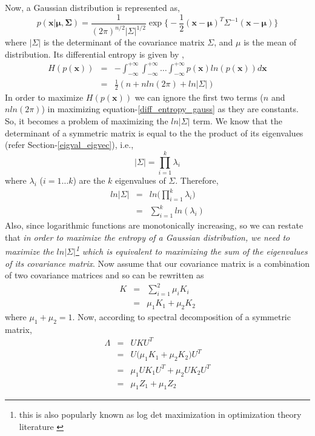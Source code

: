 Now, a Gaussian distribution is represented as,
\begin{equation}
p(\mathbf{x|\mu,\Sigma})=\frac{1}{(2\pi)^{n/2}\lvert\Sigma\rvert^{1/2}}\exp \big\lbrace -\frac{1}{2}(\mathbf{x-\mu})^{T}\Sigma^{-1} (\mathbf{x-\mu}) \big \rbrace
\end{equation}
where $\lvert\Sigma\rvert$ is the determinant of the covariance matrix $\Sigma$, and $\mu$ is the mean of distribution. Its differential entropy is given by \citep{brookes2005matrix},
\begin{eqnarray}
H(p(\mathbf{x})) &=& -\int_{-\infty}^{+\infty} \int_{-\infty}^{+\infty} \dots \int_{-\infty}^{+\infty}p(\mathbf{x})ln (p(\mathbf{x})) d\mathbf{x} \\
&=& \frac{1}{2}(n+n ln(2\pi)+ln|\Sigma|) \label{diff_entropy_gauss}
\end{eqnarray}
In order to maximize $H(p(\mathbf{x}))$ we can ignore the first two terms ($n$ and $n ln(2\pi)$) in maximizing equation-\ref{diff_entropy_gauss} as they are constants. So, it becomes a problem of maximizing the $ln|\Sigma|$ term. We know that the determinant of a symmetric matrix is equal to the the product of its eigenvalues (refer Section-\ref{eigval_eigvec}), i.e.,
\[
|\Sigma|=\prod_{i=1}^{k}\lambda_{i}
\]
where $\lambda_{i}$ ($i=1\dots k$) are the $k$ eigenvalues of $\Sigma$. Therefore,
\begin{eqnarray}
ln|\Sigma|&=& ln\big (\prod_{i=1}^{k}\lambda_{i} \big) \\
&=& \sum_{i=1}^{k} ln (\lambda_{i}) \label{max_det}
\end{eqnarray}
Also, since logarithmic functions are monotonically increasing, so we can restate that \textit{in order to maximize the entropy of a Gaussian distribution, we need to maximize the $ln|\Sigma|$\footnote{this is also popularly known as log det maximization in optimization theory literature \citep{boyd2004convexopt}} which is equivalent to maximizing the sum of the eigenvalues of its covariance matrix}. Now assume that our covariance matrix is a combination of two covariance matrices and so can be rewritten as
\begin{eqnarray}
K &=& \sum_{i=1}^{2}\mu_{i}K_{i} \\
&=& \mu_{1}K_{1}+\mu_{2}K_{2}
\end{eqnarray}
where $\mu_{1}+\mu_{2}=1$. Now, according to spectral decomposition of a symmetric matrix,
\begin{eqnarray}
\Lambda &=& UKU^{T} \\ 
&=& U\big (\mu_{1}K_{1}+\mu_{2}K_{2} \big )U^{T} \\
&=& \mu_{1}UK_{1}U^{T}+\mu_{2}UK_{2}U^{T}  \\
&=& \mu_{1}Z_{1}+ \mu_{1}Z_{2} \label{eigv_split_1} 
\end{eqnarray}
